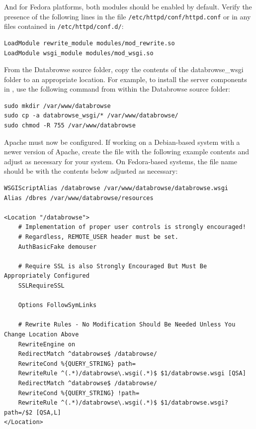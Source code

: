 \documentclass[10pt]{article}
\begin{document}
And for Fedora platforms, both modules should be enabled by default.  Verify the presence of the following lines in the file \texttt{/etc/httpd/conf/httpd.conf} or in any files contained in \texttt{/etc/httpd/conf.d/}:

\begin{verbatim}
LoadModule rewrite_module modules/mod_rewrite.so
LoadModule wsgi_module modules/mod_wsgi.so
\end{verbatim}

From the Databrowse source folder, copy the contents of the databrowse\_wsgi folder to an appropriate location.  For example, to install the server components in , use the following command from within the Databrowse source folder:

\begin{verbatim}
sudo mkdir /var/www/databrowse
sudo cp -a databrowse_wsgi/* /var/www/databrowse/
sudo chmod -R 755 /var/www/databrowse
\end{verbatim}

Apache must now be configured.  If working on a Debian-based system with a newer version of Apache, create the file  with the following example contents and adjust as necessary for your system.  On Fedora-based systems, the file name should be  with the contents below adjusted as necessary:

\begin{verbatim}
WSGIScriptAlias /databrowse /var/www/databrowse/databrowse.wsgi
Alias /dbres /var/www/databrowse/resources

<Location "/databrowse">
    # Implementation of proper user controls is strongly encouraged!
    # Regardless, REMOTE_USER header must be set.
	AuthBasicFake demouser

	# Require SSL is also Strongly Encouraged But Must Be Appropriately Configured
	SSLRequireSSL

	Options FollowSymLinks

	# Rewrite Rules - No Modification Should Be Needed Unless You Change Location Above
	RewriteEngine on
	RedirectMatch ^databrowse$ /databrowse/
	RewriteCond %{QUERY_STRING} path=
	RewriteRule ^(.*)/databrowse\.wsgi(.*)$ $1/databrowse.wsgi [QSA]
	RedirectMatch ^databrowse$ /databrowse/
	RewriteCond %{QUERY_STRING} !path=
	RewriteRule ^(.*)/databrowse\.wsgi(.*)$ $1/databrowse.wsgi?path=/$2 [QSA,L]
</Location>
\end{verbatim}
\end{document}
